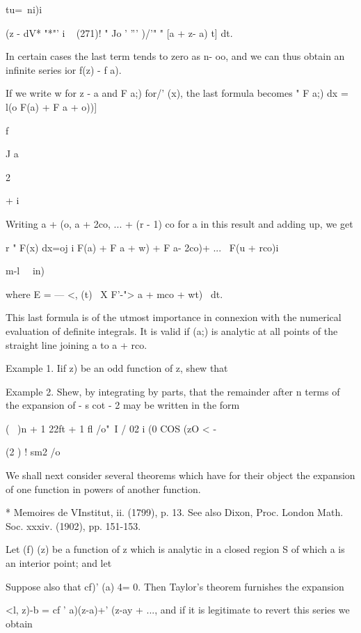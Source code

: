 tu=\ ni)i

(z - dV* "*"' i ~ (271)! " Jo ' ''' )/'" " [a + z- a) t] dt.

In certain cases the last term tends to zero as n- oo, and we can
thus obtain an infinite series ior f(z) - f a).

If we write w for z - a and F a;) for/' (x), the last formula becomes
" F a;) dx = l(o F(a) + F a + o))]

f

J a

2

+ i

Writing a + (o, a + 2co, ... + (r - 1) co for a in this result and
adding up, we get

r " F(x) dx=oj i F(a) + F a + w) + F a- 2co)+ ... \ F(u + rco)i

m-l \ \ in)\

where E = --- <, (t) \ X F'-"> a + mco + wt) \ dt.

This last formula is of the utmost importance in connexion with the
numerical evaluation of definite integrals. It is valid if (a;) is
analytic at all points of the straight line joining a to a + rco.

Example 1. Iif z) be an odd function of z, shew that

Example 2. Shew, by integrating by parts, that the remainder after n
terms of the expansion of - s cot - 2 may be written in the form

( \ )n + 1 22ft + 1 fl /o"\ I / 02 i (0 COS (zO < -

(2 ) ! sm2 /o



We shall next consider several theorems which have for their object
the expansion of one function in powers of another function.

* Memoires de VInstitut, ii. (1799), p. 13. See also Dixon, Proc.
London Math. Soc. xxxiv. (1902), pp. 151-153.

%
%

Let (f) (z) be a function of z which is analytic in a closed region S
of which a is an interior point; and let

Suppose also that cf)' (a) 4= 0. Then Taylor's theorem furnishes the
expansion

<l, z)-b = cf ' a)(z-a)+' (z-ay + ..., and if it is legitimate to
revert this series we obtain

